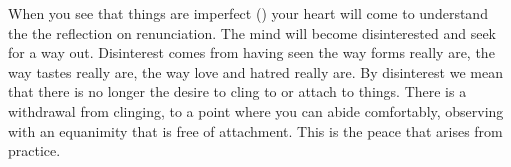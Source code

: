 When you see that things are imperfect () your heart will come to understand the  the reflection on renunciation. The mind will become disinterested and seek for a way out. Disinterest comes from having seen the way forms really are, the way tastes really are, the way love and hatred really are. By disinterest we mean that there is no longer the desire to cling to or attach to things. There is a withdrawal from clinging, to a point where you can abide comfortably, observing with an equanimity that is free of attachment. This is the peace that arises from practice. 

